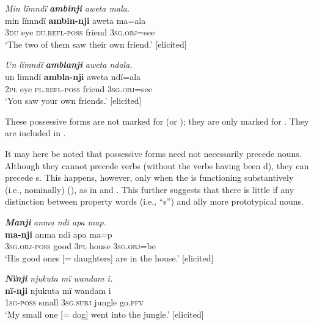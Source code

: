 \ea%
    \label{ex:pron:10}
          \textit{Min lïmndï} \textbf{\textit{ambinji}} \textit{aweta mala.}\\
\gll    min  lïmndï  \textbf{ambin-nji}    aweta  ma=ala\\
    3\textsc{du}  eye    \textsc{du.refl-poss}  friend  \textsc{3sg.obj=}see\\
\glt `The two of them saw their own friend.’ [elicited]
\z

\ea%
    \label{ex:pron:11}
          \textit{Un lïmndï} \textbf{\textit{amblanji}} \textit{aweta ndala.}\\
\gll    un  lïmndï  \textbf{ambla-nji}    aweta  ndï=ala\\
    2\textsc{pl}  eye    \textsc{pl.refl-poss}  friend  \textsc{3sg.obj=}see\\
\glt `You saw your own friends.’ [elicited]
\z

These  possessive forms are not marked for  (or ); they are only marked for . They are included in .

  It may here be noted that possessive forms need not necessarily precede nouns. Although they cannot precede verbs (without the verbs having been d), they can precede s. This happens, however, only when the  is functioning substantively (i.e., nominally) (), as in  and . This further suggests that there is little if any  distinction between property words (i.e., “s”) and ally more prototypical nouns.

\ea%
    \label{ex:pron:12}
          \textbf{\textit{Manji}} \textit{anma ndï apa map.}\\
\gll    \textbf{ma-nji}      anma  ndï  apa    ma=p\\
    3\textsc{sg.obj-poss}  good  \textsc{3pl}  house  3\textsc{sg.obj=}be\\
\glt `His good ones [= daughters] are in the house.’ [elicited]
\z

\ea%
    \label{ex:pron:13}
          \textbf{\textit{Nïnji}} \textit{njukuta mï wandam i.}\\
\gll    \textbf{nï-nji}    njukuta  mï      wandam  i\\
    1\textsc{sg-poss}  small    \textsc{3sg.subj}  jungle    go.\textsc{pfv}\\
\glt `My small one [= dog] went into the jungle.’ [elicited]
\z

